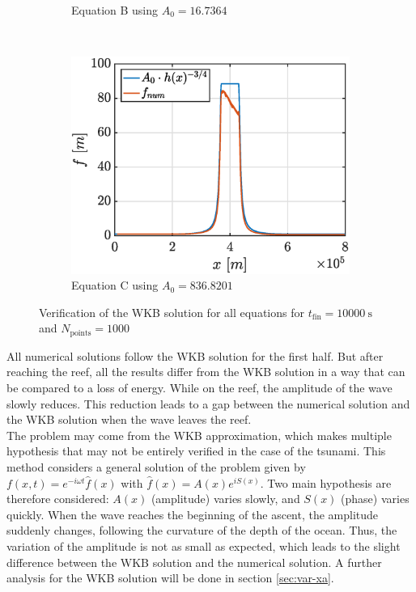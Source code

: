 \documentclass[a4paper,12pt,twoside]{article}
\begin{document}
\begin{figure}[h]
\begin{subfigure}{0.45\textwidth}
          \caption{Equation B using $A_0 = \num{16.7364}$}
          \label{fig:tsunami-amp-B}
        \end{subfigure}\\
        \centering
        \begin{subfigure}{0.45\textwidth}
          \centering
          \includegraphics[width=\textwidth]{graphs/tsunami_amp_C.eps}
          \caption{Equation C using $A_0 = \num{836.8201}$}
          \label{fig:tsunami-amp-C}
        \end{subfigure}
        \caption{Verification of the WKB solution for all equations for $t_\text{fin} = \SI{10000}{\s}$ and $N_\text{points} = \num{1000}$} %
        \label{fig:tsunami-amp}
      \end{figure}

      All numerical solutions follow the WKB solution for the first half.
      But after reaching the reef, all the results differ from the WKB solution in a way that can be compared to a loss of energy.
      While on the reef, the amplitude of the wave slowly reduces.
      This reduction leads to a gap between the numerical solution and the WKB solution when the wave leaves the reef.\\

      The problem may come from the WKB approximation, which makes multiple hypothesis that may not be entirely verified in the case of the tsunami.
      This method considers a general solution of the problem given by $f(x,t)=e^{-i\omega t}\hat{f}(x)$ with $\hat{f}(x) = A(x)e^{iS(x)}$.
      Two main hypothesis are therefore considered: $A(x)$ (amplitude) varies slowly, and $S(x)$ (phase) varies quickly.
      When the wave reaches the beginning of the ascent, the amplitude suddenly changes, following the curvature of the depth of the ocean.
      Thus, the variation of the amplitude is not as small as expected, which leads to the slight difference between the WKB solution and the numerical solution.
      A further analysis for the WKB solution will be done in section \ref{sec:var-xa}.
\end{document}

